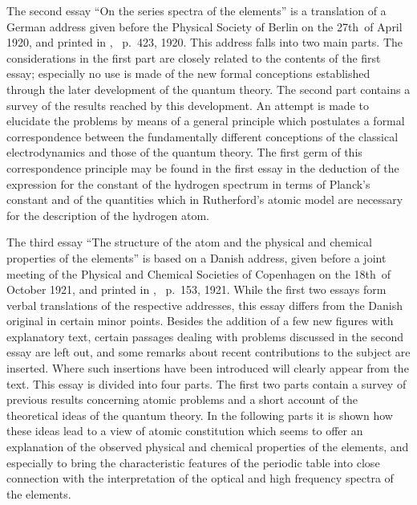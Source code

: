 The second essay ``On the series spectra of the elements'' is a
translation of a German address given before the Physical Society
of Berlin on the 27th~of April 1920, and printed in , \ p.~423, 1920. This address falls into two main parts.
The considerations in the first part are closely related to the contents
of the first essay; especially no use is made of the new
formal conceptions established through the later development of
the quantum theory. The second part contains a survey of the
results reached by this development. An attempt is made to
elucidate the problems by means of a general principle which postulates
a formal correspondence between the fundamentally different
conceptions of the classical electrodynamics and those of the
quantum theory. The first germ of this correspondence principle
may be found in the first essay in the deduction of the expression
for the constant of the hydrogen spectrum in terms of
Planck's constant and of the quantities which in Rutherford's
atomic model are necessary for the description of the hydrogen
atom.

The third essay ``The structure of the atom and the physical
and chemical properties of the elements'' is based on a Danish
address, given before a joint meeting of the Physical and Chemical
Societies of Copenhagen on the 18th~of October 1921, and printed
in , \ p.~153, 1921. While the first two essays
form verbal translations of the respective addresses, this essay
differs from the Danish original in certain minor points. Besides
the addition of a few new figures with explanatory text, certain
passages dealing with problems discussed in the second essay are
left out, and some remarks about recent contributions to the
subject are inserted. Where such insertions have been introduced
will clearly appear from the text. This essay is divided into
four parts. The first two parts contain a survey of previous results
concerning atomic problems and a short account of the theoretical
ideas of the quantum theory. In the following parts it is shown
how these ideas lead to a view of atomic constitution which seems
to offer an explanation of the observed physical and chemical
properties of the elements, and especially to bring the characteristic
features of the periodic table into close connection with the
interpretation of the optical and high frequency spectra of the
elements.

